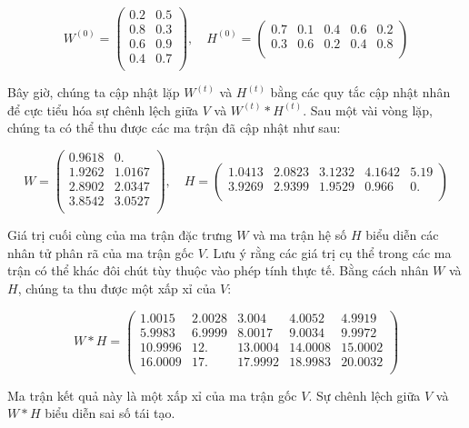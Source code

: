 \[W^{(0)} = \begin{pmatrix} 0.2 & 0.5 \\ 0.8 & 0.3 \\ 0.6 & 0.9 \\ 0.4 & 0.7 \\ \end{pmatrix}, \quad H^{(0)} = \begin{pmatrix} 0.7 & 0.1 & 0.4 & 0.6 & 0.2 \\ 0.3 & 0.6 & 0.2 & 0.4 & 0.8 \\ \end{pmatrix}\]

Bây giờ, chúng ta cập nhật lặp \(W^{(t)}\) và \(H^{(t)}\) bằng các quy tắc cập nhật nhân để cực tiểu hóa sự chênh lệch giữa \(V\) và \(W^{(t)} * H^{(t)}\). Sau một vài vòng lặp, chúng ta có thể thu được các ma trận đã cập nhật như sau:

\[W = \begin{pmatrix} 0.9618 & 0. \\ 1.9262 & 1.0167 \\ 2.8902 & 2.0347 \\ 3.8542 & 3.0527 \\ \end{pmatrix}, \quad H = \begin{pmatrix} 1.0413 & 2.0823 & 3.1232 & 4.1642 & 5.19 \\ 3.9269 & 2.9399 & 1.9529 & 0.966 & 0. \\ \end{pmatrix}\]

Giá trị cuối cùng của ma trận đặc trưng \(W\) và ma trận hệ số \(H\) biểu diễn các nhân tử phân rã của ma trận gốc \(V\). Lưu ý rằng các giá trị cụ thể trong các ma trận có thể khác đôi chút tùy thuộc vào phép tính thực tế. Bằng cách nhân \(W\) và \(H\), chúng ta thu được một xấp xỉ của \(V\):

\[W * H = \begin{pmatrix} 1.0015 & 2.0028 & 3.004 & 4.0052 & 4.9919 \\ 5.9983 & 6.9999 & 8.0017 & 9.0034 & 9.9972 \\ 10.9996 & 12. & 13.0004 & 14.0008 & 15.0002 \\ 16.0009 & 17. & 17.9992 & 18.9983 & 20.0032 \\ \end{pmatrix}\]

Ma trận kết quả này là một xấp xỉ của ma trận gốc \(V\). Sự chênh lệch giữa \(V\) và \(W * H\) biểu diễn sai số tái tạo.

